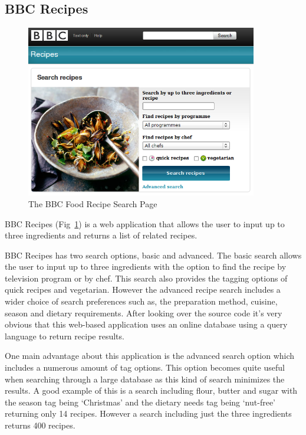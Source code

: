 \subsection{BBC Recipes}

\begin{figure}
\includegraphics[width=0.9\textwidth]{screenshot_bbc_recipes}
\caption{The BBC Food Recipe Search Page}
\label{fig:bbc_food}
\end{figure}


BBC Recipes (Fig~\ref{fig:bbc_food}) is a web application that allows the user to input up to three ingredients and returns a list of related recipes. 

BBC Recipes has two search options, basic and advanced. The basic search allows the user to input up to three ingredients with the option to find the recipe by television program or by chef. This search also provides the tagging options of quick recipes and vegetarian. However the advanced recipe search includes a wider choice of search preferences such as, the preparation method, cuisine, season and dietary requirements. After looking over the source code it’s very obvious that this web-based application uses an online database using a query language to return recipe results. 

One main advantage about this application is the advanced search option which includes a numerous amount of tag options. This option becomes quite useful when searching through a large database as this kind of search minimizes the results. A good example of this is a search including flour, butter and sugar with the season tag being ‘Christmas’ and the dietary needs tag being ‘nut-free’ returning only 14 recipes. However a search including just the three ingredients returns 400 recipes. 

